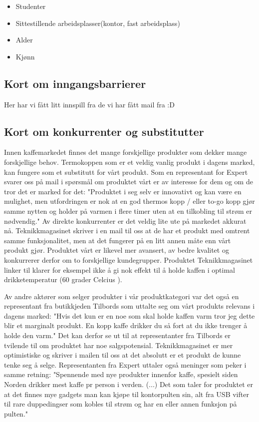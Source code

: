 \begin{itemize}
	\item Studenter
	\item Sittestillende arbeidsplasser(kontor, fast arbeidsplass)
	\item Alder
	\item Kjønn
\end{itemize}

\subsection{Kort om inngangsbarrierer}
Her har vi fått litt innspill fra de vi har fått mail fra :D
\subsection{Kort om konkurrenter og substitutter}
Innen kaffemarkedet finnes det mange forskjellige produkter som dekker mange forskjellige behov. Termokoppen som er et veldig vanlig produkt i dagens marked, kan fungere som et substitutt for vårt produkt. Som en representant for Expert svarer oss på mail i spørsmål om produktet vårt er av interesse for dem og om de tror det er marked for det: "Produktet i seg selv er innovativt og kan være en mulighet, men utfordringen er nok at en god thermos kopp / eller to-go kopp gjør samme nytten og holder på varmen i flere timer uten at en tilkobling til strøm er nødvendig." Av direkte konkurrenter er det veldig lite ute på markedet akkurat nå. Teknikkmagasinet skriver i en mail til oss at de har et produkt med omtrent samme funksjonalitet, men at det fungerer på en litt annen måte enn vårt produkt gjør. Produktet vårt er likevel mer avansert, av bedre kvalitet og konkurrerer derfor om to forskjellige kundegrupper. Produktet Teknikkmagasinet linker til \cite{tmprod} klarer for eksempel ikke å gi nok effekt til å holde kaffen i optimal drikketemperatur (60 grader Celcius \cite{optimaldrikketemperatur}).

Av andre aktører som selger produkter i vår produktkategori var det også en representant fra butikkjeden Tilbords som uttalte seg om vårt produkts relevans i dagens marked: "Hvis det kun er en noe som skal holde kaffen varm tror jeg dette blir et marginalt produkt. En kopp kaffe drikker du så fort at du ikke trenger å holde den varm." Det kan derfor se ut til at representanter fra Tilbords er tvilende til om produktet har noe salgspotensial. Teknikkmagasinet er mer optimistiske og skriver i mailen til oss at det absolutt er et produkt de kunne tenke seg å selge. Representanten fra Expert uttaler også meninger som peker i samme retning: "Spennende med nye produkter innenfor kaffe, spesielt siden Norden drikker mest kaffe pr person i verden. (...) Det som taler for produktet er at det finnes mye gadgets man kan kjøpe til kontorpulten sin, alt fra USB vifter til rare duppedingser som kobles til strøm og har en eller annen funksjon på pulten."

